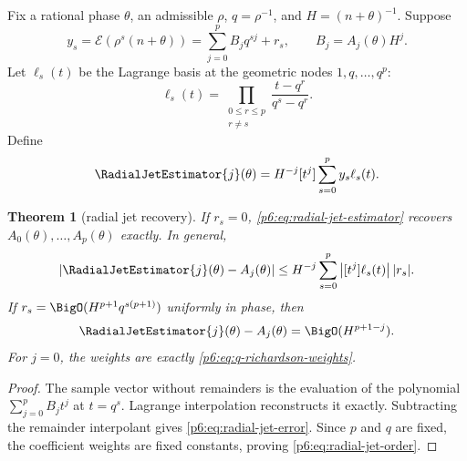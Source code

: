 \documentclass[11pt]{article}
\numberwithin{equation}{section}
\newtheorem{theorem}{Theorem}[section]
\theoremstyle{definition}
\theoremstyle{remark}
\begin{document}
Fix a rational phase $\theta$, an admissible $\rho$, $q=\rho^{-1}$, and
$H=(n+\theta)^{-1}$.  Suppose
\begin{equation}
 y_s=\mathscr E(\rho^s(n+\theta))
 =\sum_{j=0}^{p}B_jq^{sj}+r_s,
 \qquad B_j=A_j(\theta)H^j.
 \label{p6:eq:radial-polynomial-model}
\end{equation}
Let $\ell_s(t)$ be the Lagrange basis at the geometric nodes
$1,q,\ldots,q^p$:
\begin{equation}
 \ell_s(t)=\prod_{\substack{0\le r\le p\\r\ne s}}
 \frac{t-q^r}{q^s-q^r}.
 \label{p6:eq:geometric-lagrange-basis}
\end{equation}
Define
\begin{equation}
 \RadialJetEstimator{j}(\theta)
 =H^{-j}[t^j]\sum_{s=0}^{p}y_s\ell_s(t).
 \label{p6:eq:radial-jet-estimator}
\end{equation}

\begin{theorem}[radial jet recovery]
\label{p6:thm:radial-jet}
If $r_s=0$, \eqref{p6:eq:radial-jet-estimator} recovers
$A_0(\theta),\ldots,A_p(\theta)$ exactly.  In general,
\begin{equation}
 |\RadialJetEstimator{j}(\theta)-A_j(\theta)|
 \le H^{-j}\sum_{s=0}^{p}
 \left|[t^j]\ell_s(t)\right||r_s|.
 \label{p6:eq:radial-jet-error}
\end{equation}
If $r_s=\BigO(H^{p+1}q^{s(p+1)})$ uniformly in phase, then
\begin{equation}
 \RadialJetEstimator{j}(\theta)-A_j(\theta)=\BigO(H^{p+1-j}).
 \label{p6:eq:radial-jet-order}
\end{equation}
For $j=0$, the weights are exactly \eqref{p6:eq:q-richardson-weights}.
\end{theorem}

\begin{proof}
The sample vector without remainders is the evaluation of the polynomial
$\sum_{j=0}^{p}B_jt^j$ at $t=q^s$.  Lagrange interpolation reconstructs it exactly.
Subtracting the remainder interpolant gives \eqref{p6:eq:radial-jet-error}.  Since $p$ and
$q$ are fixed, the coefficient weights are fixed constants, proving
\eqref{p6:eq:radial-jet-order}.
\end{proof}
\end{document}
